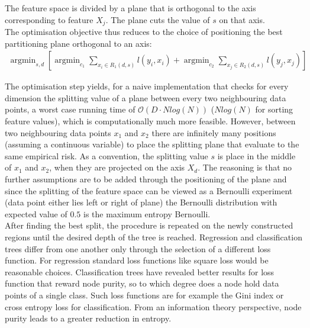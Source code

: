 \documentclass[a4paper, 11pt]{article}
\DeclareMathOperator*{\argmin}{argmin} %
\begin{document}
The feature space is divided by a plane that is orthogonal to the axis corresponding to feature $X_j$. The plane cuts the value of $s$ on that axis.\\
The optimisation objective thus reduces to the choice of positioning  the best partitioning plane orthogonal to an axis:
\begin{align*}
\argmin_{s, d}[\argmin_{c_1} \sum_{x_i \in R_1(d,s)} l(y_i, x_i) + \argmin_{c_2} \sum_{x_j \in R_2(d,s)} l(y_j, x_j)]
\end{align*}

The optimisation step yields, for a naive implementation that checks for every dimension the splitting value of a plane between every two neighbouring data points, a worst case running time of $\mathcal{O}(D \cdot N log(N))$ ($Nlog(N)$ for sorting feature values), which is computationally much more feasible. However, between two neighbouring data points $x_1$ and $x_2$ there are infinitely many positions (assuming a continuous variable) to place the splitting plane that evaluate to the same empirical risk. As a convention, the splitting value $s$ is place in the middle of $x_1$ and $x_2$, when they are projected on the axis $X_d$. The reasoning is that no further assumptions are to be added through the positioning of the plane and since the splitting of the feature space can be viewed as a Bernoulli experiment (data point either lies left or right of plane) the Bernoulli distribution with expected value of $0.5$ is the maximum entropy Bernoulli.\\

After finding the best split, the procedure is repeated on the newly constructed regions until the desired depth of the tree is reached. Regression and classification trees differ from one another only through the selection of a different loss function. For regression standard loss functions like square loss would be reasonable choices. Classification trees have revealed better results for loss function that reward node purity, so to which degree does a node hold data points of a single class. Such loss functions are for example the Gini index or cross entropy loss for classification. From an information theory perspective, node purity leads to a greater reduction in entropy.\\
\end{document}
